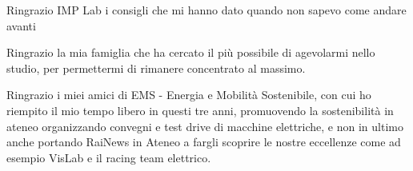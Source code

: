 \vspace*{10pc}
\thispagestyle{empty}
\begin{flushright}
\sl

Ringrazio IMP Lab i consigli che mi hanno dato quando non sapevo come andare avanti

Ringrazio la mia famiglia che ha cercato il più possibile di agevolarmi nello studio, per permettermi di rimanere concentrato al massimo.

Ringrazio i miei amici di EMS - Energia e Mobilità Sostenibile, con cui ho riempito il mio tempo libero in questi tre anni, promuovendo la sostenibilità in ateneo organizzando convegni e test drive di macchine elettriche, e non in ultimo anche portando RaiNews in Ateneo a fargli scoprire le nostre eccellenze come ad esempio VisLab e il racing team elettrico.

\end{flushright}
\par\vfill\par
